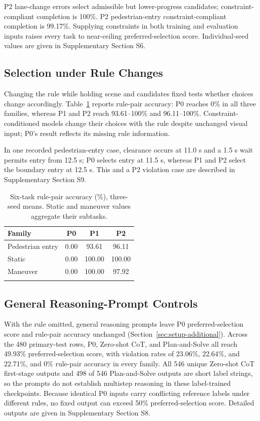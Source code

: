 P2 lane-change errors select admissible but lower-progress candidates;
constraint-compliant completion is 100\%. P2 pedestrian-entry constraint-compliant completion is 99.17\%.
Supplying constraints in both training and evaluation inputs raises every task
to near-ceiling preferred-selection score. Individual-seed values are given in Supplementary
Section S6.

\subsection{Selection under Rule Changes}\label{sec:results-association}

Changing the rule while holding scene and candidates fixed tests whether
choices change accordingly. Table~\ref{tab:results-association} reports
rule-pair accuracy: P0 reaches 0\% in all three families, whereas P1 and P2
reach 93.61--100\% and 96.11--100\%. Constraint-conditioned models change their
choices with the rule despite unchanged visual input; P0's result reflects its
missing rule information.

In one recorded pedestrian-entry case, clearance
occurs at 11.0 s and a 1.5 s wait permits entry from 12.5 s; P0 selects entry
at 11.5 s, whereas P1 and P2 select the boundary entry at 12.5 s. This and a
P2 violation case are described in Supplementary Section S9.

\begin{table}[tbp]
\caption{Six-task rule-pair accuracy (\%), three-seed means. Static and maneuver values aggregate
their subtasks.}
\label{tab:results-association}
\centering\footnotesize
\begin{tabular*}{\textwidth}{@{\extracolsep\fill}lccc@{}}
\toprule
Family & P0 & P1 & P2\\
\midrule
Pedestrian entry & 0.00 & 93.61 & 96.11\\
Static & 0.00 & 100.00 & 100.00\\
Maneuver & 0.00 & 100.00 & 97.92\\
\botrule
\end{tabular*}
\end{table}

\subsection{General Reasoning-Prompt Controls}\label{sec:results-reasoning}

With the rule omitted, general reasoning prompts leave P0 preferred-selection score and
rule-pair accuracy unchanged
(Section~\ref{sec:setup-additional}). Across the 480 primary-test rows, P0,
Zero-shot CoT, and Plan-and-Solve all reach 49.93\% preferred-selection score, with violation
rates of 23.06\%, 22.64\%, and 22.71\%, and 0\% rule-pair accuracy in every
family. All 546 unique Zero-shot CoT first-stage outputs and 498 of 546 Plan-and-Solve
outputs are short label strings, so the prompts do not establish multistep
reasoning in these label-trained checkpoints. Because identical P0 inputs carry
conflicting reference labels under different rules, no fixed output can exceed
50\% preferred-selection score. Detailed outputs are given in Supplementary Section S8.

